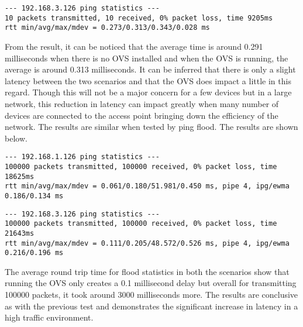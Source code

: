 \begin{lstlisting}[caption={Ping Test With OVS}, label={pingtest_ovs}]
--- 192.168.3.126 ping statistics ---
10 packets transmitted, 10 received, 0% packet loss, time 9205ms
rtt min/avg/max/mdev = 0.273/0.313/0.343/0.028 ms
\end{lstlisting}
From the result, it can be noticed that the average time is around 0.291 milliseconds when there is no OVS installed and when the OVS is running, the average is around 0.313 milliseconds. It can be inferred that there is only a slight latency between the two scenarios and that the OVS does impact a little in this regard. Though this will not be a major concern for a few devices but in a large network, this reduction in latency can impact greatly when many number of devices are connected to the access point bringing down the efficiency of the network. The results are similar when tested by ping flood. The results are shown below.

\begin{lstlisting}[caption={Ping Flood Without OVS}, label={pingflood_no_ovs}]
--- 192.168.1.126 ping statistics ---
100000 packets transmitted, 100000 received, 0% packet loss, time 18625ms
rtt min/avg/max/mdev = 0.061/0.180/51.981/0.450 ms, pipe 4, ipg/ewma 0.186/0.134 ms
\end{lstlisting}

\begin{lstlisting}[caption={Ping Flood With OVS}, label={pingflood_ovs}]
--- 192.168.3.126 ping statistics ---
100000 packets transmitted, 100000 received, 0% packet loss, time 21643ms
rtt min/avg/max/mdev = 0.111/0.205/48.572/0.526 ms, pipe 4, ipg/ewma 0.216/0.196 ms
\end{lstlisting}

The average round trip time for flood statistics in both the scenarios show that running the OVS only creates a 0.1 millisecond delay but overall for transmitting 100000 packets, it took around 3000 milliseconds more. The results are conclusive as with the previous test and demonstrates the significant increase in latency in a high traffic environment.
